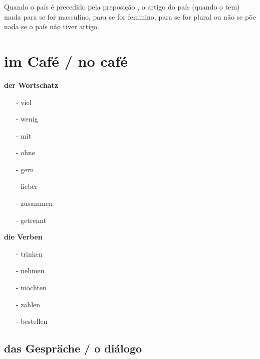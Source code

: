             Quando o país é precedido pela preposição , o artigo do país (quando o tem) muda para  se for masculino, para  se for feminino, para  se for plural ou não se põe nada se o país não tiver artigo.

    \pagebreak\section{im Café / no café}\label{section:deutsch:im_cafe}
    
        \begin{multicols}{3}
            \textbf{der Wortschatz}
            \begin{itemize}[before=\renewcommand{\baselinestretch}{1},topsep=0pt,itemsep=4pt,parsep=0pt]
                \item[-] viel 
                \item[-] wenig 
                \item[-] mit 
                \item[-] ohne 
                \item[-] gern 
                \item[-] lieber 
                \item[-] zusammen 
                \item[-] getrennt  
            \end{itemize}
        \vfill\null
        \columnbreak
            \textbf{die Verben}
            \begin{itemize}[before=\renewcommand{\baselinestretch}{1},topsep=0pt,itemsep=4pt,parsep=0pt]
                \item[-] trinken 
                \item[-] nehmen 
                \item[-] möchten 
                \item[-] zahlen 
                \item[-] bestellen  
            \end{itemize}
        \vfill\null
        \end{multicols}

        \subsection{das Gespräche / o diálogo}\label{subsection:deutsch:im_cafe:das_gesprache}


